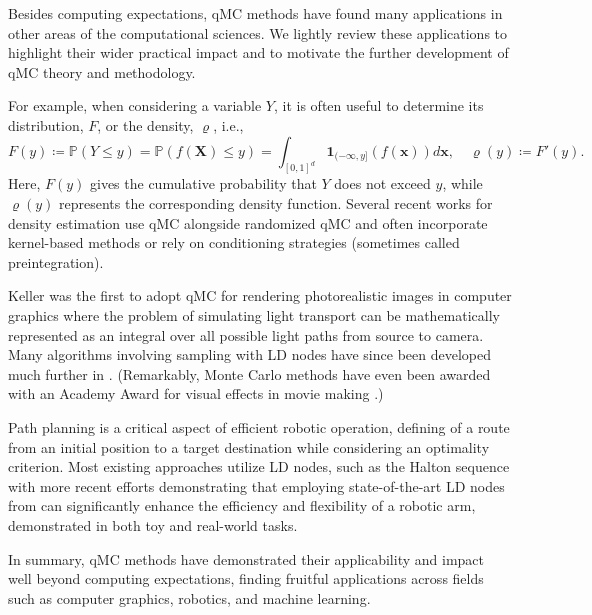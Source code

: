 \documentclass{svproc}
\newcounter{algorithm}%
\begin{document}
Besides computing expectations, qMC methods have found many applications in other areas of the computational sciences. We lightly review these applications to highlight their wider practical impact and to motivate the further development of qMC theory and methodology.

For example, when considering a variable $Y$, it is often useful to determine its distribution, $F$, or the density, $\varrho$, i.e., 
\[
F(y) \coloneqq \mathbb{P}(Y\leq y)=\mathbb{P}(f(\mathbf{X})\leq y)=\int_{[0,1]^d} \mathbf{1}_{(-\infty,y]}(f(\mathbf{x}))d\mathbf{x}, \quad \varrho(y)\coloneqq F'(y).
\]
Here, $F(y)$ gives the cumulative probability that $Y$ does not exceed $y$, while $\varrho(y)$ represents the corresponding density function. Several recent works for density estimation use qMC \cite{LEcPuc20a,LEcuyer2022b,GilKuoSlo23a} alongside randomized qMC \cite{AbdEtal21a} and often incorporate kernel-based methods or rely on conditioning strategies (sometimes called preintegration).

Keller \cite{kell95} was the first to adopt qMC for rendering photorealistic images in computer graphics where the problem of simulating light transport can be mathematically represented as an integral over all possible light paths from source to camera. Many algorithms involving sampling with LD nodes have since been developed much further in \cite{kellprem12,shired08,Keller2013a,kolkel00,kell96,kell95}. (Remarkably, Monte Carlo methods have even been awarded with an Academy Award for visual effects in movie making \cite{veachthesis,oscars}.)

Path planning is a critical aspect of efficient robotic operation, defining of a route from an initial position to a target destination while considering an optimality criterion. Most existing approaches utilize LD nodes, such as the Halton sequence \cite{veldel14,zhong24} with more recent efforts \cite{chahine24} demonstrating that employing state-of-the-art LD nodes from \cite{ruschkirk24} can significantly enhance the efficiency and flexibility of a robotic arm, demonstrated in both toy and real-world tasks.

In summary, qMC methods have demonstrated their applicability and impact well beyond computing expectations, finding fruitful applications across fields such as computer graphics, robotics, and machine learning.




\end{document}
